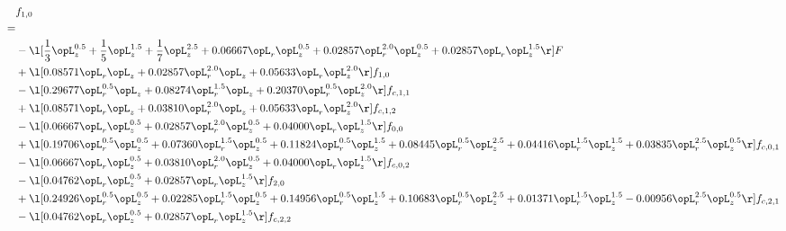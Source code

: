 \begin{alignat}{2} 
\label{eq:f_10_1} 
& f_{1,0} \nonumber \\ 
 = \\ 
& - \l[ \frac{1}{3} \opL_z^{0.5} + \frac{1}{5} \opL_z^{1.5} + \frac{1}{7} \opL_z^{2.5} +  0.06667 \opL_r \opL_z^{0.5} +  0.02857 \opL_r^{2.0} \opL_z^{0.5} +  0.02857 \opL_r \opL_z^{1.5}  \r] F \nonumber \\ 
& + \l[  0.08571 \opL_r \opL_z +  0.02857 \opL_r^{2.0} \opL_z +  0.05633 \opL_r \opL_z^{2.0}  \r] f_{1,0} \nonumber \\ 
& - \l[  0.29677 \opL_r^{0.5} \opL_z +  0.08274 \opL_r^{1.5} \opL_z +  0.20370 \opL_r^{0.5} \opL_z^{2.0}  \r] f_{c,1,1} \nonumber \\ 
& + \l[  0.08571 \opL_r \opL_z +  0.03810 \opL_r^{2.0} \opL_z +  0.05633 \opL_r \opL_z^{2.0}  \r] f_{c,1,2} \nonumber \\ 
& - \l[  0.06667 \opL_r \opL_z^{0.5} +  0.02857 \opL_r^{2.0} \opL_z^{0.5} +  0.04000 \opL_r \opL_z^{1.5}  \r] f_{0,0} \nonumber \\ 
& + \l[  0.19706 \opL_r^{0.5} \opL_z^{0.5} +  0.07360 \opL_r^{1.5} \opL_z^{0.5} +  0.11824 \opL_r^{0.5} \opL_z^{1.5} +  0.08445 \opL_r^{0.5} \opL_z^{2.5} +  0.04416 \opL_r^{1.5} \opL_z^{1.5} +  0.03835 \opL_r^{2.5} \opL_z^{0.5}  \r] f_{c,0,1} \nonumber \\ 
& - \l[  0.06667 \opL_r \opL_z^{0.5} +  0.03810 \opL_r^{2.0} \opL_z^{0.5} +  0.04000 \opL_r \opL_z^{1.5}  \r] f_{c,0,2} \nonumber \\ 
& - \l[  0.04762 \opL_r \opL_z^{0.5} +  0.02857 \opL_r \opL_z^{1.5}  \r] f_{2,0} \nonumber \\ 
& + \l[  0.24926 \opL_r^{0.5} \opL_z^{0.5} +  0.02285 \opL_r^{1.5} \opL_z^{0.5} +  0.14956 \opL_r^{0.5} \opL_z^{1.5} +  0.10683 \opL_r^{0.5} \opL_z^{2.5} +  0.01371 \opL_r^{1.5} \opL_z^{1.5}   -0.00956 \opL_r^{2.5} \opL_z^{0.5}  \r] f_{c,2,1} \nonumber \\ 
& - \l[  0.04762 \opL_r \opL_z^{0.5} +  0.02857 \opL_r \opL_z^{1.5}  \r] f_{c,2,2} \nonumber \\ 
\end{alignat} 


